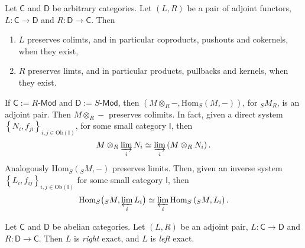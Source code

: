 \begin{prop}
	Let $\mathsf{C}$ and $\mathsf{D}$ be arbitrary categories.
	Let $\left(L, R\right)$ be a pair of adjoint functors, $L: \mathsf{C} \to \mathsf{D}$ and
	$R: \mathsf{D} \to \mathsf{C}$.
	Then
	\begin{enumerate}
		\item $L$ preserves colimts, and in particular coproducts, pushouts and cokernels,
			when they exist,
		\item $R$ preserves limts, and in particular products, pullbacks and kernels,
			when they exist.
	\end{enumerate}
\end{prop} 

\begin{ex}
	If $\mathsf{C} := R\text{-}\mathsf{Mod}$ and $\mathsf{D}:= S\text{-}\mathsf{Mod}$, then
	$\left(M \otimes_R -, \mathrm{Hom}_{S}\left( M, - \right)\right)$, for ${}_SM_R$, is an adjoint pair.
	Then $M \otimes_R -$ preserves colimits.
	In fact, given a direct system $\left\{N_i, f_{ji}\right\}_{i, j \in \mathrm{Ob} \left(\mathsf{I}\right)}$, 
	for some small category $\mathsf{I}$, then
	\begin{equation}
		M \otimes_R \varinjlim_i N_i \simeq \varinjlim_i \left( M \otimes_R N_i \right)
	.\end{equation} 
	Analogously $\mathrm{Hom}_{S}\left( {}_S M, - \right)$ preserves limits.
	Then, given an inverse system $\left\{ L_i, f_{ij} \right\}_{i,j \in \mathrm{Ob} \left(\mathsf{I}\right)}$
	for some small category $\mathsf{I}$, then
	\begin{equation}
		\mathrm{Hom}_{S}\big( {}_S M, \varprojlim_i L_i \big) \simeq
		\varprojlim_i \mathrm{Hom}_{ S}\left( {}_S M, L_i \right)
	.\end{equation} 
\end{ex} 

\begin{rem}
	Let $\mathsf{C}$ and $\mathsf{D}$ be abelian categories.
	Let $\left(L, R\right)$ be an adjoint pair, $L: \mathsf{C} \to \mathsf{D}$ and $R: \mathsf{D} \to \mathsf{C}$.
	Then $L$ is {\em right} exact, and $L$ is {\em left} exact.
\end{rem}


